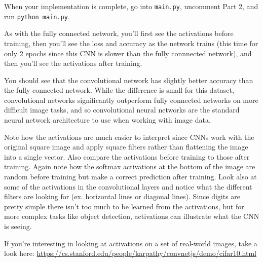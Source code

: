 \documentclass{article}
\begin{document}
When your implementation is complete, go into \texttt{main.py}, uncomment Part 2, and run \texttt{python main.py}.

As with the fully connected network, you'll first see the activations before training, then you'll see the loss and accuracy as the network trains (this time for only 2 epochs since this CNN is slower than the fully connnected network), and then you'll see the activations after training.

You should see that the convolutional network has slightly better accuracy than the fully connected network. While the difference is small for this dataset, convolutional networks significantly outperform fully connected networks on more difficult image tasks, and so convolutional neural networks are the standard neural network architecture to use when working with image data.

Note how the activations are much easier to interpret since CNNs work with the original square image and apply square filters rather than flattening the image into a single vector. Also compare the activations before training to those after training. Again note how the softmax activations at the bottom of the image are random before training but make a correct prediction after training. Look also at some of the activations in the convolutional layers and notice what the different filters are looking for (ex. horizontal lines or diagonal lines). Since digits are pretty simple there isn't too much to be learned from the activations, but for more complex tasks like object detection, activations can illustrate what the CNN is seeing.

If you're interesting in looking at activations on a set of real-world images, take a look here: \url{https://cs.stanford.edu/people/karpathy/convnetjs/demo/cifar10.html}
\end{document}
